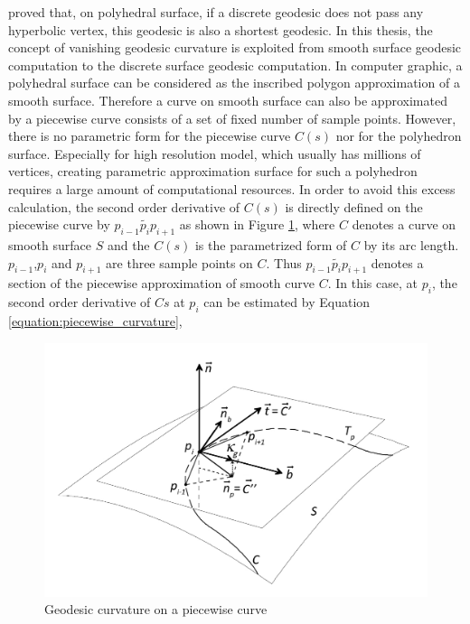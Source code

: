  proved that, on polyhedral surface, if a discrete geodesic does not pass any hyperbolic vertex, this geodesic is also a shortest geodesic. In this thesis, the concept of vanishing geodesic curvature is exploited from smooth surface geodesic computation to the discrete surface geodesic computation. In computer graphic, a polyhedral surface can be considered as the inscribed polygon approximation of a smooth surface. Therefore a curve on smooth surface can also be approximated by a piecewise curve consists of a set of fixed number of sample points. However, there is no parametric form for the piecewise curve $C(s)$ nor for the polyhedron surface. Especially for high resolution model, which usually has millions of vertices, creating parametric approximation surface for such a polyhedron requires a large amount of computational resources. In order to avoid this excess calculation, the second order derivative of $C(s)$ is directly defined on the piecewise curve by $\widetilde{p_{i-1}p_{i}p_{i+1}}$ as shown in Figure \ref{figure:geodesic_curvature_def}, where $C$ denotes a curve on smooth surface $S$ and the $C(s)$ is the parametrized form of $C$ by its arc length. $p_{i-1}$,$p_{i}$ and $p_{i+1}$ are three sample points on $C$. Thus $\widetilde{p_{i-1}p_{i}p_{i+1}}$ denotes a section of the piecewise approximation of smooth curve $C$. In this case, at $p_{i}$, the second order derivative of $C{s}$ at $p_{i}$ can be estimated by Equation \ref{equation:piecewise_curvature}, 

\begin{figure}[H]
    \centering
    \includegraphics[width=1.0\columnwidth]{../images/geodesic_polyDef_d}
    \caption{Geodesic curvature on a piecewise curve}
    \label{figure:geodesic_curvature_def}
\end{figure}



